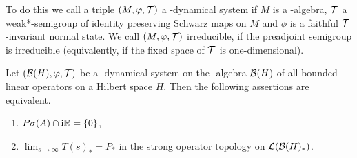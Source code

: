 To do this we call a triple $ (M,\phi,\TT) $  a \WA-dynamical system if\/ $ M $  is a \WA-algebra, $ \mathcal{T}$ a weak*-semigroup of identity preserving Schwarz maps on $ M $  and $ \phi $  is a faithful \/ $ \mathcal{T} $-invariant normal state.
We call $ (M,\phi,\TT) $  irreducible, if the preadjoint semigroup is irreducible (equivalently, if the fixed space of\/ $ \mathcal{T} $  is one-dimensional).
\begin{proposition}\label{prop:d4-3.7}
Let $ (\BH,\phi,\TT) $  be a \WA-dynamical system on the \WA-algebra $ \mathcal{B}(H) $  of all bounded linear operators on a Hilbert space $ H $.
Then the following assertions are equivalent.
\begin{enumerate}[\upshape (a)]
\item
$ P\sigma(A) \cap \mathrm{i}\mathbb{R} = \{0\} $,

\item
$ \lim_{s \to \infty} T(s)_{*} = P_{*} $  in the strong operator topology on $ \mathcal{L}(\mathcal{B}(H)_{*}) $.
\end{enumerate}
\end{proposition}
